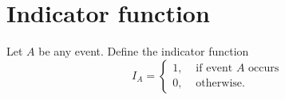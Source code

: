 \section{Indicator function}

\par 
Let $A$ be any event. Define the indicator function 
\[
    I_A = \left\{
        \begin{array}{ll}
            1, & \text{ if event } A \text{ occurs} \\
            0, & \text{ otherwise.}
        \end{array}
     \right.  
\]